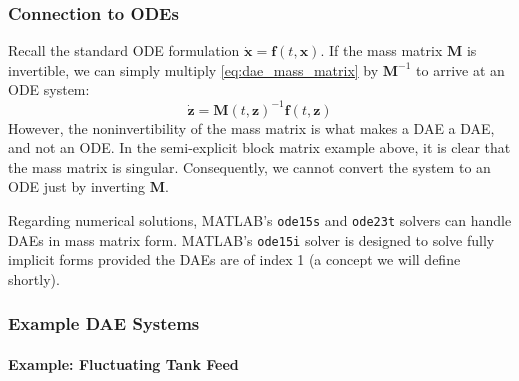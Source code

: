 \subsubsection{Connection to ODEs}
Recall the standard ODE formulation $\dot{\mathbf{x}} = \mathbf{f}(t, \mathbf{x})$. If the mass matrix $\mathbf{M}$ is invertible, we can simply multiply \autoref{eq:dae_mass_matrix} by $\mathbf{M}^{-1}$ to arrive at an ODE system:
\begin{equation}
    \dot{\mathbf{z}} = \mathbf{M}(t, \mathbf{z})^{-1}\mathbf{f}(t, \mathbf{z})
\end{equation}
However, the noninvertibility of the mass matrix is what makes a DAE a DAE, and not an ODE. In the semi-explicit block matrix example above, it is clear that the mass matrix is singular. Consequently, we cannot convert the system to an ODE just by inverting $\mathbf{M}$. 

Regarding numerical solutions, MATLAB's \texttt{ode15s} and \texttt{ode23t} solvers can handle DAEs in mass matrix form. MATLAB's \texttt{ode15i} solver is designed to solve fully implicit forms provided the DAEs are of index 1 (a concept we will define shortly).

\subsubsection{Example DAE Systems}
\paragraph*{Example: Fluctuating Tank Feed}

